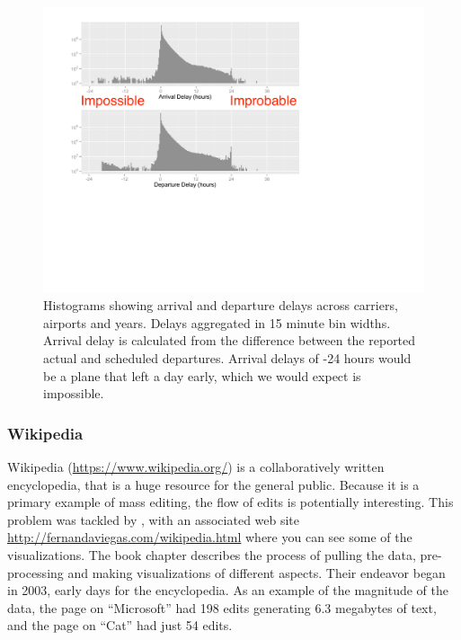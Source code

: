 \documentclass{article}
\begin{document}
\begin{figure}[t]
\centerline{\includegraphics[width=5in]{images/airlines1.pdf}}
\caption{Histograms showing arrival and departure delays across carriers, airports and years. Delays aggregated in 15 minute bin widths. Arrival delay is calculated from the difference between the reported actual and scheduled departures. Arrival delays of -24 hours would be a plane that left a day early, which we would expect is impossible. }
\label{airlines1}
\end{figure}

\subsubsection{Wikipedia}

Wikipedia (\url{https://www.wikipedia.org/}) is a collaboratively written encyclopedia, that is a huge resource for the general public. Because it is a primary example of mass editing, the flow of edits is potentially interesting. This problem was tackled by \citet{wiki}, with an associated web site \url{http://fernandaviegas.com/wikipedia.html} where you can see some of the visualizations. The book chapter describes the process of pulling the data, pre-processing and making visualizations of different aspects. Their endeavor began in 2003, early days for the encyclopedia. As an example of the magnitude of the data, the page on ``Microsoft'' had 198 edits generating 6.3 megabytes of text, and the page on ``Cat'' had just 54 edits.
\end{document}
